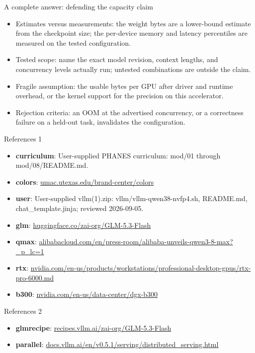 \documentclass[aspectratio=169,11pt]{beamer}
\begin{document}
\begin{frame}[t,fragile]{A complete answer: defending the capacity claim}
\fontsize{11.5}{14}\selectfont
\begin{itemize}\setlength{\itemsep}{2mm}
\item Estimates versus measurements: the weight bytes are a lower-bound estimate from the checkpoint size; the per-device memory and latency percentiles are measured on the tested configuration.
\item Tested scope: name the exact model revision, context lengths, and concurrency levels actually run; untested combinations are outside the claim.
\item Fragile assumption: the usable bytes per GPU after driver and runtime overhead, or the kernel support for the precision on this accelerator.
\item Rejection criteria: an OOM at the advertised concurrency, or a correctness failure on a held-out task, invalidates the configuration.
\end{itemize}
\end{frame}
\begin{frame}[t]{References 1}
\fontsize{9}{12}\selectfont\begin{itemize}\setlength{\itemsep}{3mm}
\item \textbf{curriculum}: User-supplied PHANES curriculum: mod/01 through mod/08/README.md.
\item \textbf{colors}: \href{https://umac.utexas.edu/brand-center/colors/}{umac.utexas.edu/brand-center/colors}
\item \textbf{user}: User-supplied vllm(1).zip: vllm/vllm-qwen38-nvfp4.sh, README.md, chat\_template.jinja; reviewed 2026-09-05.
\item \textbf{glm}: \href{https://huggingface.co/zai-org/GLM-5.3-Flash}{huggingface.co/zai-org/GLM-5.3-Flash}
\item \textbf{qmax}: \href{https://www.alibabacloud.com/en/press-room/alibaba-unveils-qwen3-8-max?_p_lc=1}{alibabacloud.com/en/press-room/alibaba-unveils-qwen3-8-max?\_p\_lc=1}
\item \textbf{rtx}: \href{https://www.nvidia.com/en-us/products/workstations/professional-desktop-gpus/rtx-pro-6000.md}{nvidia.com/en-us/products/workstations/professional-desktop-gpus/rtx-pro-6000.md}
\item \textbf{b300}: \href{https://www.nvidia.com/en-us/data-center/dgx-b300/}{nvidia.com/en-us/data-center/dgx-b300}
\end{itemize}\end{frame}
\begin{frame}[t]{References 2}
\fontsize{9}{12}\selectfont\begin{itemize}\setlength{\itemsep}{3mm}
\item \textbf{glmrecipe}: \href{https://recipes.vllm.ai/zai-org/GLM-5.3-Flash}{recipes.vllm.ai/zai-org/GLM-5.3-Flash}
\item \textbf{parallel}: \href{https://docs.vllm.ai/en/v0.5.1/serving/distributed_serving.html}{docs.vllm.ai/en/v0.5.1/serving/distributed\_serving.html}
\end{itemize}\end{frame}
\end{document}
